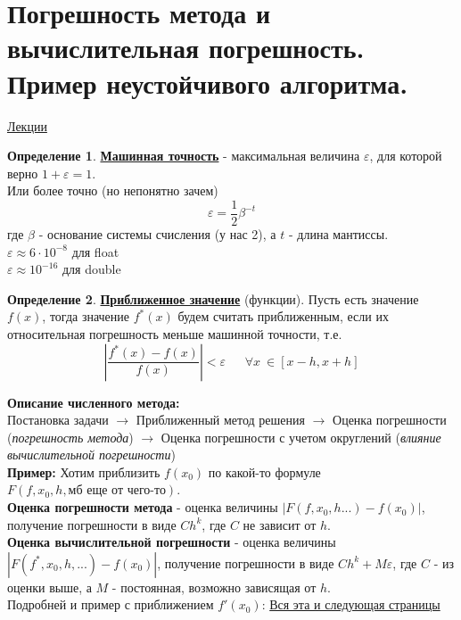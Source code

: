 \documentclass[specialist, subf, href, colorlinks=true, 12pt, times, mtpro, final]{disser}
\theoremstyle{definition}
\newtheorem{defn}{Определение}[section]
\begin{document}
\tableofcontents

\section {Погрешность метода и вычислительная погрешность. Пример неустойчивого алгоритма.}
    \hyperlink {lects.12}{Лекции} \\
    \begin{defn}
    	\textbf{\hyperlink {lects.13}{Машинная точность}} - максимальная величина $\varepsilon$, для которой верно $1+\varepsilon=1$. \\
    	Или более точно (но непонятно зачем)
    	$$
    		\varepsilon = \frac{1}{2}\beta^{-t}
    	$$
    	где $\beta$ - основание системы счисления (у нас 2), а $t$ - длина мантиссы.\\
    	$\varepsilon \approx 6 \cdot 10^{-8}$ для float\\
    	$\varepsilon \approx 10^{-16}$ для double
    \end{defn}
	\begin{defn}
		\textbf{\hyperlink {lects.13}{Приближенное значение}} (функции). Пусть есть значение $f(x)$, тогда значение $f^*(x)$ будем считать приближенным, если их относительная погрешность меньше машинной точности, т.е.
		$$
			\left| \frac{f^*(x) - f(x)}{f(x)} \right| < \varepsilon \ \ \ \ \ \ \ \forall x \ \in [x-h,x+h]
		$$
	\end{defn}
    \textbf{Описание численного метода:}\\
    Постановка задачи $\rightarrow$ Приближенный метод решения $\rightarrow$ Оценка погрешности (\textit{погрешность метода}) $\rightarrow$ Оценка погрешности с учетом округлений (\textit{влияние вычислительной погрешности})  \\
    \textbf{Пример:} Хотим приблизить $f(x_0)$ по какой-то формуле $F(f, x_0, h, \text{мб еще от чего-то})$. \\
    \textbf{Оценка погрешности метода} - оценка  величины $|F(f,x_0,h...) - f(x_0)|$, получение погрешности в виде $Ch^k$, где $C$ не зависит от $h$. \\
    \textbf{Оценка вычислительной погрешности} - оценка величины $|F(f^*, x_0, h, ...) - f(x_0)|$, получение погрешности в виде $Ch^k + M\varepsilon$, где $C$ - из оценки выше, а $M$ - постоянная, возможно зависящая от $h$.\\
    Подробней и пример с приближением $f'(x_0)$: \hyperlink {lects.12}{Вся эта и следующая страницы}
\end{document}
